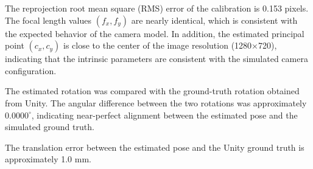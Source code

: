 \documentclass[conference]{IEEEtran}
\begin{document}
The reprojection root mean square (RMS) error of the calibration is 0.153 pixels. The focal length values $(f_x, f_y)$ are nearly identical, which is consistent with the expected behavior of the camera model. In addition, the estimated principal point $(c_x, c_y)$ is close to the center of the image resolution (1280×720), indicating that the intrinsic parameters are consistent with the simulated camera configuration.



The estimated rotation was compared with the ground-truth rotation obtained from Unity. The angular difference between the two rotations was approximately $0.0000^\circ$, indicating near-perfect alignment between the estimated pose and the simulated ground truth.



The translation error between the estimated pose and the Unity ground truth is approximately 1.0 mm.

\end{document}
